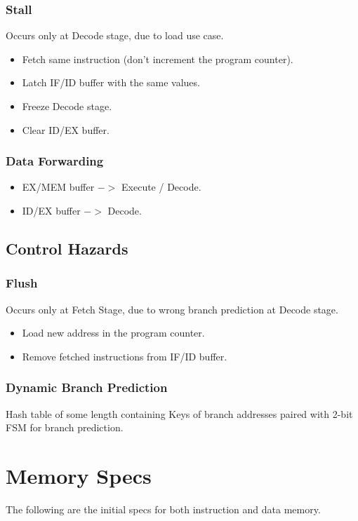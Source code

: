 \documentclass[12pt]{report}
\begin{document}
\subsubsection{Stall}
Occurs only at Decode stage, due to load use case.
\begin{itemize}
    \item Fetch same instruction (don't increment the program counter).
    \item Latch IF/ID buffer with the same values.
    \item Freeze Decode stage.
    \item Clear ID/EX buffer.
\end{itemize}

\subsubsection{Data Forwarding}
\begin{itemize}
    \item EX/MEM buffer $->$ Execute / Decode.
    \item ID/EX buffer $->$ Decode.
\end{itemize}

\subsection{Control Hazards}

\subsubsection{Flush}
Occurs only at Fetch Stage, due to wrong branch prediction at Decode stage.
\begin{itemize}
    \item Load new address in the program counter.
    \item Remove fetched instructions from IF/ID buffer.
\end{itemize}

\subsubsection{Dynamic Branch Prediction}
Hash table of some length containing Keys of branch addresses paired with 2-bit FSM for branch prediction.

\section{Memory Specs}
The following are the initial specs for both instruction and data memory.
\end{document}
